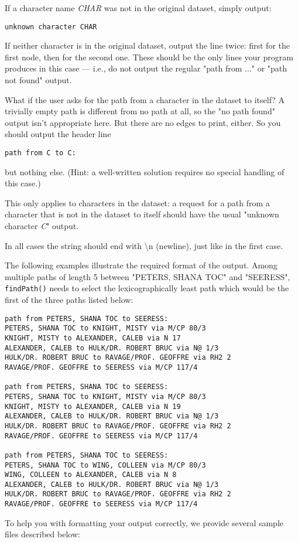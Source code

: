 \documentclass[11pt]{article}
\begin{document}
If a character name \textit{CHAR} was not in the original dataset, simply output:
\begin{verbatim}
unknown character CHAR
\end{verbatim}

\noindent If neither character is in the original dataset, output the line twice: first for the first node, then for the second one. These should be the only lines your program produces in this case — i.e., do not output the regular "path from ..." or "path not found" output.

\noindent What if the user asks for the path from a character in the dataset to itself? A trivially empty path is different from no path at all, so the "no path found" output isn't appropriate here. But there are no edges to print, either. So you should output the header line

\begin{verbatim}path from C to C:
\end{verbatim}
but nothing else. (Hint: a well-written solution requires no special handling of this case.)

\noindent This only applies to characters in the dataset: a request for a path from a character that is not in the dataset to itself should have the usual "unknown character \textit{C}" output.

\noindent In all cases the string should end with \textbackslash n (newline), just like in the first case.

\noindent The following examples illustrate the required format of the output. Among multiple paths of length 5 between "PETERS, SHANA TOC" and "SEERESS", \texttt{findPath()} needs to select the lexicographically least path which would be the first of the three paths listed below:

\begin{verbatim}
path from PETERS, SHANA TOC to SEERESS:
PETERS, SHANA TOC to KNIGHT, MISTY via M/CP 80/3
KNIGHT, MISTY to ALEXANDER, CALEB via N 17
ALEXANDER, CALEB to HULK/DR. ROBERT BRUC via N@ 1/3
HULK/DR. ROBERT BRUC to RAVAGE/PROF. GEOFFRE via RH2 2
RAVAGE/PROF. GEOFFRE to SEERESS via M/CP 117/4

path from PETERS, SHANA TOC to SEERESS:
PETERS, SHANA TOC to KNIGHT, MISTY via M/CP 80/3
KNIGHT, MISTY to ALEXANDER, CALEB via N 19
ALEXANDER, CALEB to HULK/DR. ROBERT BRUC via N@ 1/3
HULK/DR. ROBERT BRUC to RAVAGE/PROF. GEOFFRE via RH2 2
RAVAGE/PROF. GEOFFRE to SEERESS via M/CP 117/4

path from PETERS, SHANA TOC to SEERESS:
PETERS, SHANA TOC to WING, COLLEEN via M/CP 80/3
WING, COLLEEN to ALEXANDER, CALEB via N 8
ALEXANDER, CALEB to HULK/DR. ROBERT BRUC via N@ 1/3
HULK/DR. ROBERT BRUC to RAVAGE/PROF. GEOFFRE via RH2 2
RAVAGE/PROF. GEOFFRE to SEERESS via M/CP 117/4
\end{verbatim}
To help you with formatting your output correctly, we provide several sample files described below:
\end{document}
